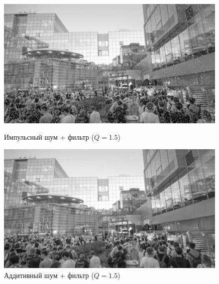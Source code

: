 \documentclass[a4paper]{article}
\begin{document}
\begin{figure}[H]
    \begin{minipage}{0.49\textwidth}
        \centering \includegraphics[width=\textwidth]{images/2_low_filters/impulse - contrharmonic (Q=1.5).jpg}
        \caption{Импульсный шум + фильтр ($Q = 1.5$)}
    \end{minipage}\hfill
    \begin{minipage}{0.49\textwidth}
        \centering \includegraphics[width=\textwidth]{images/2_low_filters/additive - contrharmonic (Q=1.5).jpg}
        \caption{Аддитивный шум + фильтр ($Q = 1.5$)}
    \end{minipage}
\end{figure}
\end{document}

